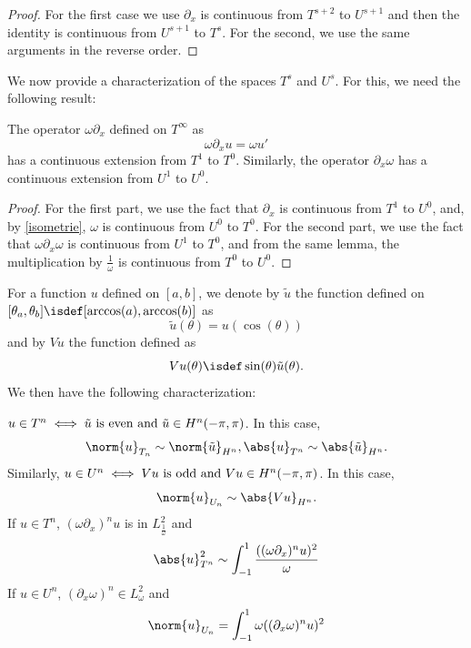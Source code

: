 \documentclass[a4paper]{article}
\begin{document}
	\begin{proof}
		For the first case we use $\partial_x$ is continuous from $T^{s+2}$ to $U^{s+1}$ and then the identity is continuous from $U^{s+1}$ to $T^s$. For the second, we use the same arguments in the reverse order. 
	\end{proof}
	We now provide a characterization of the spaces $T^s$ and $U^s$. For this, we need the following result:
	\begin{Cor}
		\label{omegadxetdxomga}
		The operator $\omega \partial_x$ defined on $T^{\infty}$ as 
		\[\omega \partial_x u = \omega u'\]
		has a continuous extension from $T^1$ to $T^0$. Similarly, the operator $\partial_x \omega$ has a continuous extension from $U^1$ to $U^0$. 
		\begin{proof}
			For the first part, we use the fact that $\partial_x$ is continuous from $T^1$ to $U^0$, and, by \autoref{isometrie}, $\omega$ is continuous from $U^0$ to $T^0$. 
			For the second part, we use the fact that $\omega \partial_x \omega$ is continuous from $U^1$ to $T^0$, and from the same lemma, the multiplication by $\frac{1}{\omega}$ is continuous from $T^0$ to $U^0$. 
		\end{proof}
	\end{Cor}
	For a function $u$ defined on $[a,b]$, we denote by $\tilde{u}$ the function defined on $[\theta_a,\theta_b] \isdef [\arccos(a),\arccos(b)]$ as
	\[ \tilde{u}(\theta) = u(\cos(\theta))\]
	and by $Vu$ the function defined as 
	\[Vu(\theta) \isdef \sin(\theta) \tilde{u}(\theta).\]
	We then have the following characterization:
	\begin{The}
		$u \in T^n \iff \tilde{u} \textup{ is even and } \tilde{u}\in H^n(-\pi,\pi)$. In this case, 
		\[ \norm{u}_{T_n}\sim \norm{\tilde{u}}_{H^n}, \abs{u}_{T^n} \sim \abs{\tilde{u}}_{H^n}.\]
		Similarly, $u \in U^n \iff Vu \textup{ is odd and } Vu \in H^n(-\pi,\pi)$. In this case, 
		\[\norm{u}_{U_n} \sim \abs{Vu}_{H^n}.\]	
		If $ u \in T^n$, $(\omega \partial_x)^n u$ is in $L^2_\frac{1}{\omega}$ and 
		\[ \abs{u}_{T^n}^2 \sim \int_{-1}^{1} \frac{((\omega \partial_x)^n u)^2}{\omega}\]
		\noindent If $u \in U^n$, $(\partial_x \omega)^n \in L^2_\omega$ and 
		\[ \norm{u}_{U_n} = \int_{-1}^{1}\omega ((\partial_x \omega)^n u)^2\]
		\label{thmChar}
	\end{The}
\end{document}
